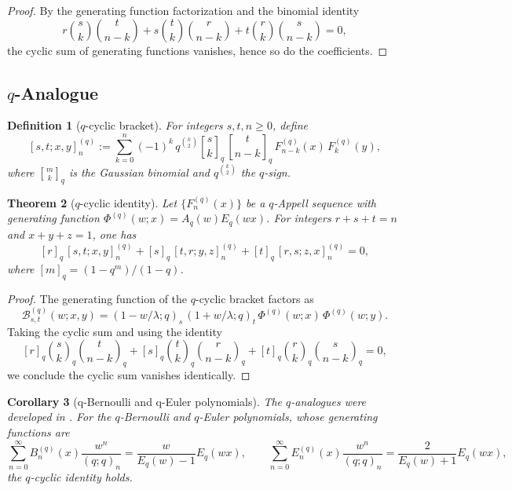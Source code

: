 \documentclass[12pt]{article}
\numberwithin{equation}{section}
\newtheorem{theorem}{Theorem}[section]
\newtheorem{definition}[theorem]{Definition}
\newtheorem{corollary}[theorem]{Corollary}
\begin{document}
\begin{proof}
By the generating function factorization and the binomial identity
\[
r\binom{s}{k}\binom{t}{n-k} + s\binom{t}{k}\binom{r}{n-k}
+ t\binom{r}{k}\binom{s}{n-k} = 0,
\]
the cyclic sum of generating functions vanishes, hence so do the coefficients.
\end{proof}

\subsection*{\texorpdfstring{$q$-Analogue}{q-Analogue}}

\begin{definition}[$q$-cyclic bracket]
For integers $s,t,n\ge0$, define
\[
[s,t;x,y]_n^{(q)} :=
\sum_{k=0}^{n} (-1)^k\,q^{\binom{k}{2}}
   \genfrac{[}{]}{0pt}{}{s}{k}_q\,
   \genfrac{[}{]}{0pt}{}{t}{n-k}_q\,
   F_{n-k}^{(q)}(x)\,F_k^{(q)}(y),
\]
where $\genfrac{[}{]}{0pt}{}{m}{k}_q$ is the Gaussian binomial
and $q^{\binom{k}{2}}$ the $q$-sign.
\end{definition}

\begin{theorem}[$q$-cyclic identity]
Let $\{F_n^{(q)}(x)\}$ be a $q$-Appell sequence with generating function
$\Phi^{(q)}(w;x)=A_q(w)E_q(wx)$. For integers $r+s+t=n$ and $x+y+z=1$, one has
\[
[r]_q\,[s,t;x,y]_n^{(q)} +
[s]_q\,[t,r;y,z]_n^{(q)} +
[t]_q\,[r,s;z,x]_n^{(q)} = 0,
\]
where $[m]_q=(1-q^m)/(1-q)$.
\end{theorem}

\begin{proof}
The generating function of the $q$-cyclic bracket factors as
\[
\mathcal{B}^{(q)}_{s,t}(w;x,y)
=(1-w/\lambda;q)_s\,(1+w/\lambda;q)_t\,
\Phi^{(q)}(w;x)\,\Phi^{(q)}(w;y).
\]
Taking the cyclic sum and using the identity
\[
[r]_q\binom{s}{k}_q\binom{t}{n-k}_q
+[s]_q\binom{t}{k}_q\binom{r}{n-k}_q
+[t]_q\binom{r}{k}_q\binom{s}{n-k}_q=0,
\]
we conclude the cyclic sum vanishes identically.
\end{proof}

\begin{corollary}[q-Bernoulli and q-Euler polynomials]
The $q$-analogues were developed in \cite{GuoPan2011}.
For the $q$-Bernoulli and $q$-Euler polynomials, whose generating functions are
\[
\sum_{n=0}^\infty B_n^{(q)}(x)\frac{w^n}{(q;q)_n}
= \frac{w}{E_q(w)-1}E_q(wx),\qquad
\sum_{n=0}^\infty E_n^{(q)}(x)\frac{w^n}{(q;q)_n}
= \frac{2}{E_q(w)+1}E_q(wx),
\]
the $q$-cyclic identity holds.
\end{corollary}
\end{document}
